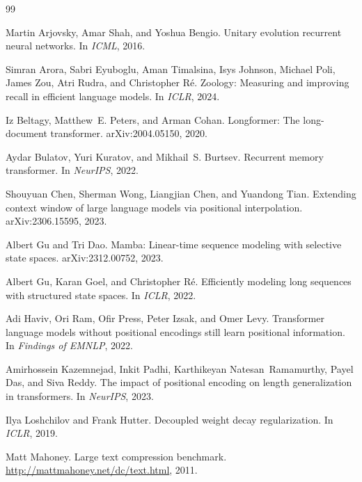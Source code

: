 \documentclass[11pt]{article}
\begin{document}
\begin{thebibliography}{99}

Martin Arjovsky, Amar Shah, and Yoshua Bengio. Unitary evolution recurrent neural
networks. In \emph{ICML}, 2016.

Simran Arora, Sabri Eyuboglu, Aman Timalsina, Isys Johnson, Michael Poli, James
Zou, Atri Rudra, and Christopher R\'e. Zoology: Measuring and improving recall in
efficient language models. In \emph{ICLR}, 2024.

Iz Beltagy, Matthew~E. Peters, and Arman Cohan. Longformer: The long-document
transformer. arXiv:2004.05150, 2020.

Aydar Bulatov, Yuri Kuratov, and Mikhail~S. Burtsev. Recurrent memory transformer.
In \emph{NeurIPS}, 2022.

Shouyuan Chen, Sherman Wong, Liangjian Chen, and Yuandong Tian. Extending context
window of large language models via positional interpolation. arXiv:2306.15595,
2023.

Albert Gu and Tri Dao. Mamba: Linear-time sequence modeling with selective state
spaces. arXiv:2312.00752, 2023.

Albert Gu, Karan Goel, and Christopher R\'e. Efficiently modeling long sequences with
structured state spaces. In \emph{ICLR}, 2022.

Adi Haviv, Ori Ram, Ofir Press, Peter Izsak, and Omer Levy. Transformer language
models without positional encodings still learn positional information. In
\emph{Findings of EMNLP}, 2022.

Amirhossein Kazemnejad, Inkit Padhi, Karthikeyan Natesan~Ramamurthy, Payel Das,
and Siva Reddy. The impact of positional encoding on length generalization in
transformers. In \emph{NeurIPS}, 2023.

Ilya Loshchilov and Frank Hutter. Decoupled weight decay regularization. In
\emph{ICLR}, 2019.

Matt Mahoney. Large text compression benchmark.
\url{http://mattmahoney.net/dc/text.html}, 2011.


\end{thebibliography}
\end{document}
